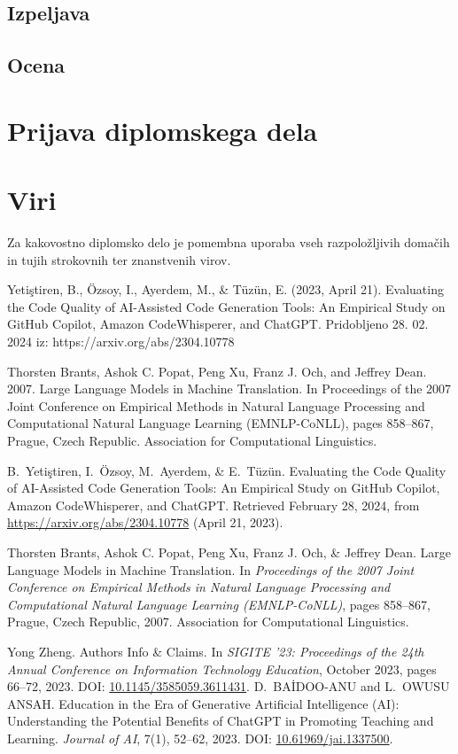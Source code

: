 \documentclass[12pt,a4paper]{book}
\begin{document}
\section{Izpeljava}

\section{Ocena}

\chapter{Prijava diplomskega dela}





\chapter{Viri}
Za kakovostno diplomsko delo je pomembna uporaba vseh razpoložljivih doma\-čih in tujih strokovnih ter znanstvenih virov.

Yetiştiren, B., Özsoy, I., Ayerdem, M., \& Tüzün, E. (2023, April 21). Evaluating the Code Quality of AI-Assisted Code Generation Tools: An Empirical Study on GitHub Copilot, Amazon CodeWhisperer, and ChatGPT. Pridobljeno 28. 02. 2024 iz: https://arxiv.org/abs/2304.10778

Thorsten Brants, Ashok C. Popat, Peng Xu, Franz J. Och, and Jeffrey Dean. 2007. Large Language Models in Machine Translation. In Proceedings of the 2007 Joint Conference on Empirical Methods in Natural Language Processing and Computational Natural Language Learning (EMNLP-CoNLL), pages 858–867, Prague, Czech Republic. Association for Computational Linguistics.

\begin{thebibliography}{9}
B.~Yetiştiren, I.~Özsoy, M.~Ayerdem, \& E.~Tüzün.
\newblock Evaluating the Code Quality of AI-Assisted Code Generation Tools: An Empirical Study on GitHub Copilot, Amazon CodeWhisperer, and ChatGPT.
\newblock Retrieved February 28, 2024, from \url{https://arxiv.org/abs/2304.10778} (April 21, 2023).

Thorsten Brants, Ashok C. Popat, Peng Xu, Franz J. Och, \& Jeffrey Dean.
\newblock Large Language Models in Machine Translation.
\newblock In \textit{Proceedings of the 2007 Joint Conference on Empirical Methods in Natural Language Processing and Computational Natural Language Learning (EMNLP-CoNLL)}, pages 858--867, Prague, Czech Republic, 2007. Association for Computational Linguistics.

Yong Zheng.
\newblock Authors Info \& Claims.
\newblock In \textit{SIGITE '23: Proceedings of the 24th Annual Conference on Information Technology Education}, October 2023, pages 66--72, 2023. DOI: \url{10.1145/3585059.3611431}.
D.~BAİDOO-ANU and L.~OWUSU ANSAH.
\newblock Education in the Era of Generative Artificial Intelligence (AI): Understanding the Potential Benefits of ChatGPT in Promoting Teaching and Learning.
\newblock \textit{Journal of AI}, 7(1), 52--62, 2023. DOI: \url{10.61969/jai.1337500}.

\end{thebibliography}
\end{document}
